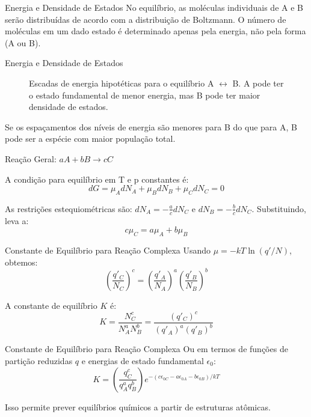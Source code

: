 \documentclass{beamer}
\begin{document}
\begin{frame}{Energia e Densidade de Estados}
        No equilíbrio, as moléculas individuais de A e B serão distribuídas de acordo com a distribuição de Boltzmann. O número de moléculas em um dado estado é determinado apenas pela energia, não pela forma (A ou B).


\end{frame}
\begin{frame}{Energia e Densidade de Estados}
        \begin{figure}
        \centering
        \caption{Escadas de energia hipotéticas para o equilíbrio A $\leftrightarrow$ B. A pode ter o estado fundamental de menor energia, mas B pode ter maior densidade de estados.}
        \end{figure}
        Se os espaçamentos dos níveis de energia são menores para B do que para A, B pode ser a espécie com maior população total.
\end{frame}

\begin{frame}{Reação Geral: $aA + bB \rightarrow cC$}
        
        A condição para equilíbrio em T e p constantes é:
        $$ dG = \mu_A dN_A + \mu_B dN_B + \mu_C dN_C = 0 $$
         
        As restrições estequiométricas são:
        $ dN_A = -\frac{a}{c}dN_C $ e $ dN_B = -\frac{b}{c}dN_C $. 
        Substituindo, leva a:
        $$ c\mu_C = a\mu_A + b\mu_B $$
        
\end{frame}

\begin{frame}{Constante de Equilíbrio para Reação Complexa}
        Usando $\mu = -kT \ln(q'/N)$, obtemos:
        $$ \left(\frac{q'_C}{N_C}\right)^c = \left(\frac{q'_A}{N_A}\right)^a \left(\frac{q'_B}{N_B}\right)^b $$
         
        A constante de equilíbrio $K$ é:
        $$ K = \frac{N_C^c}{N_A^a N_B^b} = \frac{(q'_C)^c}{(q'_A)^a (q'_B)^b} $$
        
\end{frame}

\begin{frame}{Constante de Equilíbrio para Reação Complexa}
        Ou em termos de funções de partição reduzidas $q$ e energias de estado fundamental $\epsilon_0$:
        $$ K = \left(\frac{q_C^c}{q_A^a q_B^b}\right) e^{-(c\epsilon_{0C} - a\epsilon_{0A} - b\epsilon_{0B})/kT} $$
        
        Isso permite prever equilíbrios químicos a partir de estruturas atômicas.
\end{frame}
\end{document}
